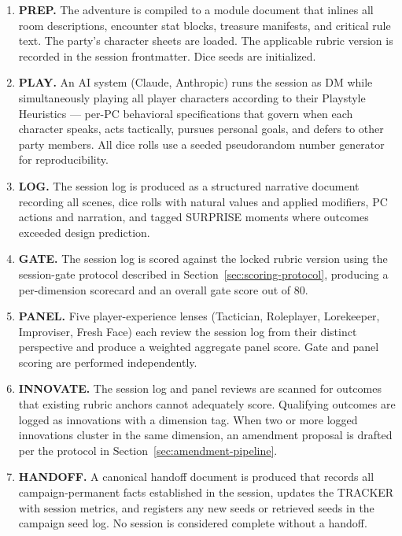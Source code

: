 \begin{enumerate}
  \item \textbf{PREP.} The adventure is compiled to a module document that inlines all
  room descriptions, encounter stat blocks, treasure manifests, and critical rule text.
  The party's character sheets are loaded. The applicable rubric version is recorded in
  the session frontmatter. Dice seeds are initialized.

  \item \textbf{PLAY.} An AI system (Claude, Anthropic) runs the session as DM while
  simultaneously playing all player characters according to their Playstyle Heuristics ---
  per-PC behavioral specifications that govern when each character speaks, acts
  tactically, pursues personal goals, and defers to other party members. All dice rolls
  use a seeded pseudorandom number generator for reproducibility.

  \item \textbf{LOG.} The session log is produced as a structured narrative document
  recording all scenes, dice rolls with natural values and applied modifiers, PC actions
  and narration, and tagged SURPRISE moments where outcomes exceeded design prediction.

  \item \textbf{GATE.} The session log is scored against the locked rubric version
  using the session-gate protocol described in Section~\ref{sec:scoring-protocol},
  producing a per-dimension scorecard and an overall gate score out of 80.

  \item \textbf{PANEL.} Five player-experience lenses (Tactician, Roleplayer,
  Lorekeeper, Improviser, Fresh Face) each review the session log from their distinct
  perspective and produce a weighted aggregate panel score. Gate and panel scoring
  are performed independently.

  \item \textbf{INNOVATE.} The session log and panel reviews are scanned for outcomes
  that existing rubric anchors cannot adequately score. Qualifying outcomes are logged
  as innovations with a dimension tag. When two or more logged innovations cluster in
  the same dimension, an amendment proposal is drafted per the protocol in
  Section~\ref{sec:amendment-pipeline}.

  \item \textbf{HANDOFF.} A canonical handoff document is produced that records all
  campaign-permanent facts established in the session, updates the TRACKER with session
  metrics, and registers any new seeds or retrieved seeds in the campaign seed log.
  No session is considered complete without a handoff.
\end{enumerate}


